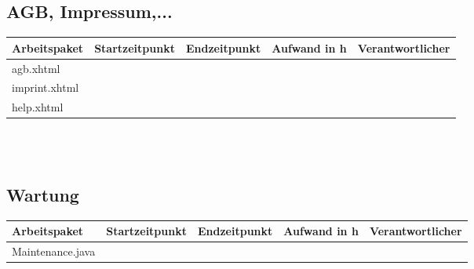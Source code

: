 \begin{landscape}
	\subsection{AGB, Impressum,...}
	\begin{tabular}{|p{10cm}|p{4cm}|p{3cm}|p{3cm}|p{3cm}|}
		\hline  \textbf{Arbeitspaket} & \textbf{Startzeitpunkt} & \textbf{Endzeitpunkt} & \textbf{Aufwand in h} & \textbf{Verantwortlicher} \\ 
		\hline   agb.xhtml                                 &                            &                             &                     &\\
		\hline   imprint.xhtml                              &                            &                             &                     &\\
		\hline   help.xhtml        &                            &                             &                     &\\
		\hline 
	\end{tabular} \ \\
	\ \\	
	
	\subsection{Wartung}
	\begin{tabular}{|p{10cm}|p{4cm}|p{3cm}|p{3cm}|p{3cm}|}
		\hline  \textbf{Arbeitspaket} & \textbf{Startzeitpunkt} & \textbf{Endzeitpunkt} & \textbf{Aufwand in h} & \textbf{Verantwortlicher} \\ 
		\hline   Maintenance.java                           &                            &                             &                     &\\
		\hline
	\end{tabular}				
\end{landscape}